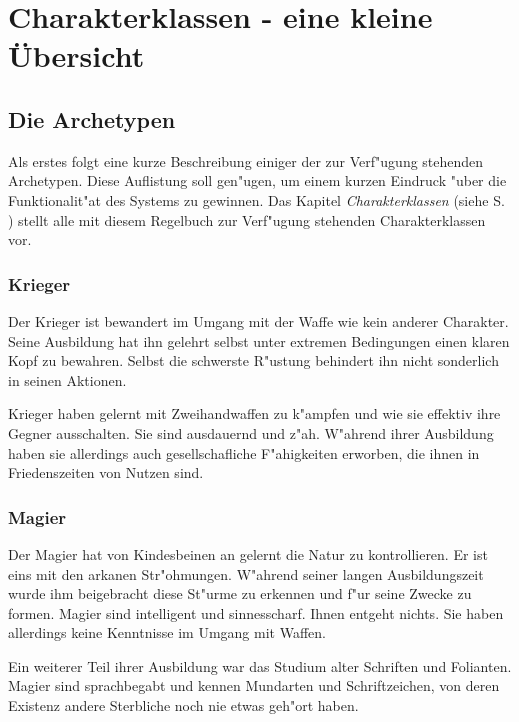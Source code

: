 \section{Charakterklassen - eine kleine Übersicht}
\subsection{Die Archetypen}
\par Als erstes folgt eine kurze Beschreibung einiger der zur Verf"ugung stehenden Archetypen. 
Diese Auflistung soll gen"ugen, um einem kurzen Eindruck "uber die Funktionalit"at des Systems zu gewinnen. Das 
Kapitel \textit{Charakterklassen} (siehe S. \pageref{charakterklassen}) stellt alle mit 
diesem Regelbuch zur Verf"ugung stehenden Charakterklassen vor.
\subsubsection{Krieger}
\par Der Krieger ist bewandert im Umgang mit der Waffe wie kein anderer Charakter. Seine Ausbildung 
hat ihn gelehrt selbst unter extremen Bedingungen einen klaren Kopf zu bewahren. Selbst die schwerste R"ustung 
behindert ihn nicht sonderlich in seinen Aktionen.
\par Krieger haben gelernt mit Zweihandwaffen zu k"ampfen und wie sie 
effektiv ihre Gegner ausschalten.
Sie sind ausdauernd und z"ah. W"ahrend ihrer Ausbildung haben sie allerdings auch gesellschafliche F"ahigkeiten 
erworben, die ihnen in Friedenszeiten von Nutzen sind.
\subsubsection{Magier}
\par Der Magier hat von Kindesbeinen an gelernt die Natur zu kontrollieren. Er ist eins mit den 
arkanen Str"ohmungen. W"ahrend seiner langen Ausbildungszeit wurde ihm beigebracht diese 
St"urme zu erkennen und f"ur seine Zwecke zu formen. Magier sind intelligent und sinnesscharf. 
Ihnen entgeht nichts. Sie haben allerdings keine Kenntnisse im Umgang mit Waffen.
\par Ein weiterer Teil ihrer Ausbildung war das Studium alter Schriften und Folianten. 
Magier sind sprachbegabt und kennen Mundarten und Schriftzeichen, von deren Existenz andere 
Sterbliche noch nie etwas geh"ort haben.
